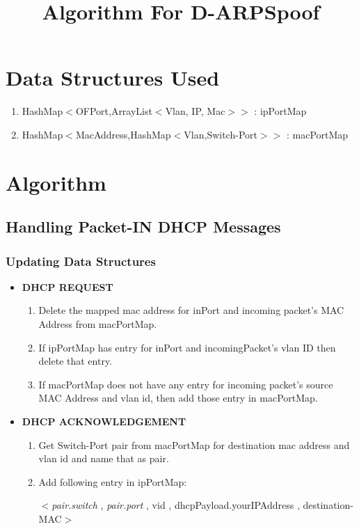 \documentclass{article}
\title{Algorithm For D-ARPSpoof}
\renewcommand{\maketitle}{

	\begin{center}
		{\huge\noindent\ignorespaces\textbf{\thetitle}\par}
	\end{center}
	\vspace{0.3in}
	
}
\begin{document}
\maketitle

\section{Data Structures Used}

\begin{enumerate}
	\item HashMap$<$OFPort,ArrayList$<$Vlan, IP, Mac$>$$>$ : ipPortMap
	\item HashMap$<$MacAddress,HashMap$<$Vlan,Switch-Port$>$$>$ : macPortMap
\end{enumerate}

\section{Algorithm}


\subsection{Handling Packet-IN DHCP Messages}


\subsubsection{Updating Data Structures} \label{dhcp-ds}


\begin{itemize}
	\item \textbf{DHCP REQUEST}

		\begin{enumerate}
			\item Delete the mapped mac address for inPort and incoming packet's MAC Address from macPortMap.
			\item If ipPortMap has entry for inPort and incomingPacket's vlan ID then delete that entry.
			\item If macPortMap does not have any entry for incoming packet's source MAC Address and vlan id, then add those entry in macPortMap.
		\end{enumerate}
	\item \textbf{DHCP ACKNOWLEDGEMENT} \label{dhcp-ack}
		\begin{enumerate}
			\item Get Switch-Port pair from macPortMap for destination mac address and vlan id and name that as pair.
			\item Add following entry in ipPortMap:

				\small{
					$<$\textit{pair.switch} ,  \textit{pair.port} , vid , dhcpPayload.yourIPAddress , destination-MAC$>$
				}
		\end{enumerate}

\end{itemize}
\end{document}

